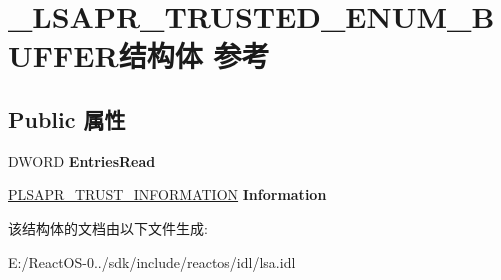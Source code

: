 \hypertarget{struct___l_s_a_p_r___t_r_u_s_t_e_d___e_n_u_m___b_u_f_f_e_r}{}\section{\+\_\+\+L\+S\+A\+P\+R\+\_\+\+T\+R\+U\+S\+T\+E\+D\+\_\+\+E\+N\+U\+M\+\_\+\+B\+U\+F\+F\+E\+R结构体 参考}
\label{struct___l_s_a_p_r___t_r_u_s_t_e_d___e_n_u_m___b_u_f_f_e_r}
\subsection*{Public 属性}
\begin{DoxyCompactItemize}
\item 
\mbox{\label{struct___l_s_a_p_r___t_r_u_s_t_e_d___e_n_u_m___b_u_f_f_e_r_a78f4ba83378bc21c2954f441fd43088f}} 
D\+W\+O\+RD {\bfseries Entries\+Read}
\item 
\mbox{\label{struct___l_s_a_p_r___t_r_u_s_t_e_d___e_n_u_m___b_u_f_f_e_r_afb5e39d8b4da9ad3ee167c96748f5d4b}} 
\hyperlink{struct___l_s_a_p_r___t_r_u_s_t___i_n_f_o_r_m_a_t_i_o_n}{P\+L\+S\+A\+P\+R\+\_\+\+T\+R\+U\+S\+T\+\_\+\+I\+N\+F\+O\+R\+M\+A\+T\+I\+ON} {\bfseries Information}
\end{DoxyCompactItemize}


该结构体的文档由以下文件生成\+:\begin{DoxyCompactItemize}
\item 
E\+:/\+React\+O\+S-\/0../sdk/include/reactos/idl/lsa.\+idl\end{DoxyCompactItemize}
